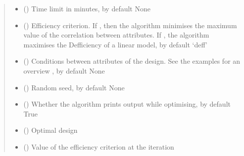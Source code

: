 \documentclass[a4paper,10pt,english]{sphinxhowto}
\begin{document}
\begin{fulllineitems}
\begin{fulllineitems}
\begin{quote}
\begin{description}
\begin{itemize}
\item {} 
\sphinxAtStartPar
{} (\sphinxstyleliteralemphasis{\sphinxupquote{, }}) \textendash{} Time limit in minutes, by default None

\item {} 
\sphinxAtStartPar
{} (\sphinxstyleliteralemphasis{\sphinxupquote{, }}) \textendash{} Efficiency criterion. If , then the algorithm minimises
the maximum value of the correlation between attributes. If ,
the algorithm maximises the D\sphinxhyphen{}efficiency of a linear model, by default ‘deff’

\item {} 
\sphinxAtStartPar
{} (\sphinxstyleliteralemphasis{\sphinxupquote{, }}) \textendash{} Conditions between attributes of the design. See the examples for an overview
, by default None

\item {} 
\sphinxAtStartPar
{} (\sphinxstyleliteralemphasis{\sphinxupquote{, }}) \textendash{} Random seed, by default None

\item {} 
\sphinxAtStartPar
{} (\sphinxstyleliteralemphasis{\sphinxupquote{, }}) \textendash{} Whether the algorithm prints output while optimising, by default True

\end{itemize}

\sphinxAtStartPar
\begin{itemize}
\item {} 
\sphinxAtStartPar
{} () \textendash{} Optimal design

\item {} 
\sphinxAtStartPar
{} () \textendash{} Value of the efficiency criterion at the  iteration


\end{itemize}
\end{description}
\end{quote}
\end{fulllineitems}
\end{fulllineitems}
\end{document}
